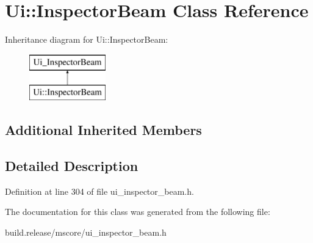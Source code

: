 \hypertarget{class_ui_1_1_inspector_beam}{}\section{Ui\+:\+:Inspector\+Beam Class Reference}
\label{class_ui_1_1_inspector_beam}
Inheritance diagram for Ui\+:\+:Inspector\+Beam\+:\begin{figure}[H]
\begin{center}
\leavevmode
\includegraphics[height=2.000000cm]{class_ui_1_1_inspector_beam}
\end{center}
\end{figure}
\subsection*{Additional Inherited Members}


\subsection{Detailed Description}


Definition at line 304 of file ui\+\_\+inspector\+\_\+beam.\+h.



The documentation for this class was generated from the following file\+:\begin{DoxyCompactItemize}
\item 
build.\+release/mscore/ui\+\_\+inspector\+\_\+beam.\+h\end{DoxyCompactItemize}
